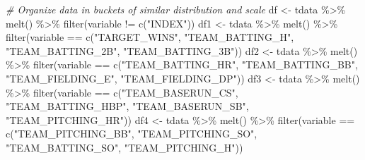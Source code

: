 \documentclass[
]{article}
\newenvironment{Shaded}{\begin{snugshade}}{\end{snugshade}}
\newcommand{\CommentTok}[1]{\textcolor[rgb]{0.56,0.35,0.01}{\textit{#1}}}
\newcommand{\FunctionTok}[1]{\textcolor[rgb]{0.00,0.00,0.00}{#1}}
\newcommand{\NormalTok}[1]{#1}
\newcommand{\OtherTok}[1]{\textcolor[rgb]{0.56,0.35,0.01}{#1}}
\newcommand{\SpecialCharTok}[1]{\textcolor[rgb]{0.00,0.00,0.00}{#1}}
\newcommand{\StringTok}[1]{\textcolor[rgb]{0.31,0.60,0.02}{#1}}
\begin{document}
\begin{Shaded}
\begin{Highlighting}[]
\CommentTok{\# Organize data in buckets of similar distribution and scale}
\NormalTok{df }\OtherTok{\textless{}{-}}\NormalTok{ tdata }\SpecialCharTok{\%\textgreater{}\%}
       \FunctionTok{melt}\NormalTok{() }\SpecialCharTok{\%\textgreater{}\%} 
       \FunctionTok{filter}\NormalTok{(variable }\SpecialCharTok{!=} \FunctionTok{c}\NormalTok{(}\StringTok{"INDEX"}\NormalTok{))}
\NormalTok{df1 }\OtherTok{\textless{}{-}}\NormalTok{ tdata }\SpecialCharTok{\%\textgreater{}\%}
       \FunctionTok{melt}\NormalTok{() }\SpecialCharTok{\%\textgreater{}\%} 
       \FunctionTok{filter}\NormalTok{(variable }\SpecialCharTok{==} \FunctionTok{c}\NormalTok{(}\StringTok{"TARGET\_WINS"}\NormalTok{, }
                       \StringTok{"TEAM\_BATTING\_H"}\NormalTok{, }
                       \StringTok{"TEAM\_BATTING\_2B"}\NormalTok{,}
                       \StringTok{"TEAM\_BATTING\_3B"}\NormalTok{))}
\NormalTok{df2 }\OtherTok{\textless{}{-}}\NormalTok{ tdata }\SpecialCharTok{\%\textgreater{}\%}
       \FunctionTok{melt}\NormalTok{() }\SpecialCharTok{\%\textgreater{}\%} 
       \FunctionTok{filter}\NormalTok{(variable }\SpecialCharTok{==} \FunctionTok{c}\NormalTok{(}\StringTok{"TEAM\_BATTING\_HR"}\NormalTok{, }
                       \StringTok{"TEAM\_BATTING\_BB"}\NormalTok{,}
                       \StringTok{"TEAM\_FIELDING\_E"}\NormalTok{,}
                       \StringTok{"TEAM\_FIELDING\_DP"}\NormalTok{))}
\NormalTok{df3 }\OtherTok{\textless{}{-}}\NormalTok{ tdata }\SpecialCharTok{\%\textgreater{}\%}
       \FunctionTok{melt}\NormalTok{() }\SpecialCharTok{\%\textgreater{}\%} 
       \FunctionTok{filter}\NormalTok{(variable }\SpecialCharTok{==} \FunctionTok{c}\NormalTok{(}\StringTok{"TEAM\_BASERUN\_CS"}\NormalTok{, }
                       \StringTok{"TEAM\_BATTING\_HBP"}\NormalTok{, }
                       \StringTok{"TEAM\_BASERUN\_SB"}\NormalTok{,}
                       \StringTok{"TEAM\_PITCHING\_HR"}\NormalTok{))}
\NormalTok{df4 }\OtherTok{\textless{}{-}}\NormalTok{ tdata }\SpecialCharTok{\%\textgreater{}\%}
  \FunctionTok{melt}\NormalTok{() }\SpecialCharTok{\%\textgreater{}\%} 
  \FunctionTok{filter}\NormalTok{(variable }\SpecialCharTok{==} \FunctionTok{c}\NormalTok{(}\StringTok{"TEAM\_PITCHING\_BB"}\NormalTok{, }
                       \StringTok{"TEAM\_PITCHING\_SO"}\NormalTok{, }
                       \StringTok{"TEAM\_BATTING\_SO"}\NormalTok{,}
                       \StringTok{"TEAM\_PITCHING\_H"}\NormalTok{))}


\end{Highlighting}
\end{Shaded}
\end{document}
